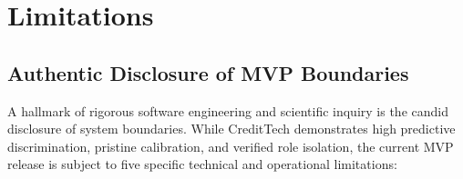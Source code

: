 \chapter{Limitations}
\label{chap:limitations}

\section{Authentic Disclosure of MVP Boundaries}
A hallmark of rigorous software engineering and scientific inquiry is the candid disclosure of system boundaries. While CreditTech demonstrates high predictive discrimination, pristine calibration, and verified role isolation, the current MVP release is subject to five specific technical and operational limitations:

